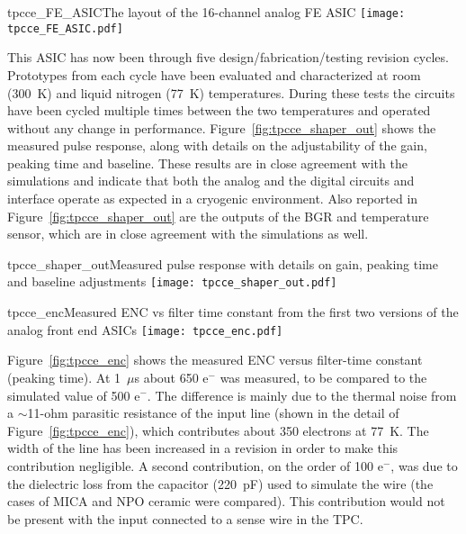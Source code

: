\begin{cdrfigure}{tpcce_FE_ASIC}{The layout of the 16-channel analog FE ASIC}
\texttt{[image: tpcce\_FE\_ASIC.pdf]} %
\end{cdrfigure}

This ASIC has now been through five design/fabrication/testing revision cycles.
Prototypes from each cycle have been evaluated and characterized at room (300~K) and liquid nitrogen (77~K) temperatures.
During these tests the circuits have been cycled multiple times
between the two temperatures and operated without any change in performance.
Figure~\ref{fig:tpcce_shaper_out} shows the measured pulse response, along with
details on the adjustability of the gain, peaking time and baseline.
These results are in close agreement with the simulations and indicate
that both the analog and the digital circuits and interface operate as
expected in a cryogenic environment.
Also reported in Figure~\ref{fig:tpcce_shaper_out} are the outputs of the BGR and temperature sensor,
which are in close agreement with the simulations as well.

\begin{cdrfigure}{tpcce_shaper_out}{Measured pulse response with details on gain, peaking time and baseline adjustments}
\texttt{[image: tpcce\_shaper\_out.pdf]}
\end{cdrfigure}

\begin{cdrfigure}{tpcce_enc}{Measured ENC vs filter time constant from the first two versions of the analog front end ASICs}
\texttt{[image: tpcce\_enc.pdf]}
\end{cdrfigure}

Figure~\ref{fig:tpcce_enc} shows the measured ENC versus filter-time constant (peaking time).
At 1~$\mu$s about 650 e$^{-}$ was measured, to be compared to the simulated value of 500 e$^{-}$.
The difference is mainly due to the thermal noise from a $\sim$11-ohm parasitic resistance of the input
line (shown in the detail of Figure~\ref{fig:tpcce_enc}), which contributes about 350 electrons at 77~K.
The width of the line has been increased in a revision in order to make this contribution negligible.
A second contribution, on the order of 100 e$^{-}$,
was due to the dielectric loss from the capacitor (220~pF) used to simulate the wire
(the cases of MICA and NPO ceramic were compared).
This contribution would not be present with the input connected to a sense wire in the TPC.

